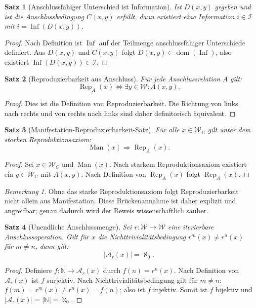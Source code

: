 \documentclass[11pt,a4paper]{article}
\newtheorem{satz}{Satz}[section]
\theoremstyle{remark}
\newtheorem{bemerkung}{Bemerkung}[section]
\newcommand{\W}{\mathcal{W}}
\newcommand{\I}{\mathcal{I}}
\newcommand{\A}{\mathcal{A}}
\newcommand{\Inf}{\operatorname{Inf}}
\newcommand{\Man}{\operatorname{Man}}
\newcommand{\Rep}{\operatorname{Rep}}
\newcommand{\dom}{\operatorname{dom}}
\begin{document}
\begin{satz}[Anschlussfähiger Unterschied ist Information]
Ist $D(x,y)$ gegeben und ist die Anschlussbedingung $C(x,y)$ erfüllt, dann existiert eine Information $i\in\I$ mit $i=\Inf(D(x,y))$.
\end{satz}
\begin{proof}
Nach Definition ist $\Inf$ auf der Teilmenge anschlussfähiger Unterschiede definiert. Aus $D(x,y)$ und $C(x,y)$ folgt $D(x,y)\in\dom(\Inf)$, also existiert $\Inf(D(x,y))\in\I$.
\end{proof}

\begin{satz}[Reproduzierbarkeit aus Anschluss]
Für jede Anschlussrelation $A$ gilt:
\[
\Rep_A(x) \Leftrightarrow \exists y\in\W:A(x,y).
\]
\end{satz}
\begin{proof}
Dies ist die Definition von Reproduzierbarkeit. Die Richtung von links nach rechts und von rechts nach links sind daher definitorisch äquivalent.
\end{proof}

\begin{satz}[Manifestation-Reproduzierbarkeit-Satz]
Für alle $x\in\W_C$ gilt unter dem starken Reproduktionsaxiom:
\[
\Man(x)\Rightarrow \Rep_A(x).
\]
\end{satz}
\begin{proof}
Sei $x\in\W_C$ und $\Man(x)$. Nach starkem Reproduktionsaxiom existiert ein $y\in\W_C$ mit $A(x,y)$. Nach Definition von $\Rep_A(x)$ folgt $\Rep_A(x)$.
\end{proof}

\begin{bemerkung}
Ohne das starke Reproduktionsaxiom folgt Reproduzierbarkeit nicht allein aus Manifestation. Diese Brückenannahme ist daher explizit und angreifbar; genau dadurch wird der Beweis wissenschaftlich sauber.
\end{bemerkung}

\begin{satz}[Unendliche Anschlussmenge]
Sei $r:\W\to\W$ eine iterierbare Anschlussoperation. Gilt für $x$ die Nichttrivialitätsbedingung $r^m(x)\neq r^n(x)$ für $m\neq n$, dann gilt:
\[
|\A_r(x)|=\aleph_0.
\]
\end{satz}
\begin{proof}
Definiere $f:\mathbb{N}\to\A_r(x)$ durch $f(n)=r^n(x)$. Nach Definition von $\A_r(x)$ ist $f$ surjektiv. Nach Nichttrivialitätsbedingung gilt für $m\neq n$: $f(m)=r^m(x)\neq r^n(x)=f(n)$; also ist $f$ injektiv. Somit ist $f$ bijektiv und $|\A_r(x)|=|\mathbb{N}|=\aleph_0$.
\end{proof}
\end{document}
